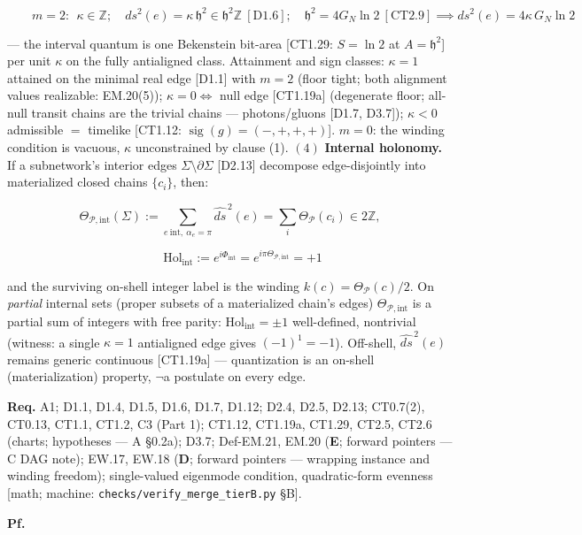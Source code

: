 \begin{theorem}
\[
\qquad m=2:\ \ \kappa\in\mathbb Z;\quad ds^2(e)=\kappa\,\mathfrak h^2\in\mathfrak h^2\mathbb Z\ [\mathrm{D1.6}];\quad \mathfrak h^2=4G_N\ln2\ [\mathrm{CT2.9}]\implies ds^2(e)=4\kappa\,G_N\ln2
\]

— the interval quantum is one Bekenstein bit-area [CT1.29: $S=\ln2$ at $A=\mathfrak h^2$] per unit $\kappa$ on the fully antialigned class. Attainment and sign classes: $\kappa=1$ attained on the minimal real edge [D1.1] with $m=2$ (floor tight; both alignment values realizable: EM.20(5)); $\kappa=0\iff$ null edge [CT1.19a] (degenerate floor; all-null transit chains are the trivial chains — photons/gluons [D1.7, D3.7]); $\kappa<0$ admissible $=$ timelike [CT1.12: $\operatorname{sig}(g)=(-,+,+,+)$]. $m=0$: the winding condition is vacuous, $\kappa$ unconstrained by clause (1). $(4)$ \textbf{Internal holonomy.} If a subnetwork's interior edges $\Sigma\setminus\partial\Sigma$ [D2.13] decompose edge-disjointly into materialized closed chains $\{c_i\}$, then:

\[
\Theta_{\mathcal P,\mathrm{int}}(\Sigma):=\!\!\sum_{e\ \mathrm{int},\ \alpha_e=\pi}\!\!\widehat{ds}^{\,2}(e)=\sum_i\Theta_{\mathcal P}(c_i)\in2\mathbb Z,
\]

\[
\qquad \mathrm{Hol}_{\mathrm{int}}:=e^{i\Phi_{\mathrm{int}}}=e^{i\pi\Theta_{\mathcal P,\mathrm{int}}}=+1
\]

and the surviving on-shell integer label is the winding $k(c)=\Theta_{\mathcal P}(c)/2$. On \textit{partial} internal sets (proper subsets of a materialized chain's edges) $\Theta_{\mathcal P,\mathrm{int}}$ is a partial sum of integers with free parity: $\mathrm{Hol}_{\mathrm{int}}=\pm1$ well-defined, nontrivial (witness: a single $\kappa=1$ antialigned edge gives $(-1)^1=-1$). Off-shell, $\widehat{ds}^{\,2}(e)$ remains generic continuous [CT1.19a] — quantization is an on-shell (materialization) property, $\neg$a postulate on every edge.

\textbf{Req.} A1; D1.1, D1.4, D1.5, D1.6, D1.7, D1.12; D2.4, D2.5, D2.13; CT0.7(2), CT0.13, CT1.1, CT1.2, C3 (Part 1); CT1.12, CT1.19a, CT1.29, CT2.5, CT2.6 (charts; hypotheses — A §0.2a); D3.7; Def-EM.21, EM.20 (\textbf{E}; forward pointers — C DAG note); EW.17, EW.18 (\textbf{D}; forward pointers — wrapping instance and winding freedom); single-valued eigenmode condition, quadratic-form evenness [math; machine: \texttt{checks/\allowbreak{}verify\_\allowbreak{}merge\_\allowbreak{}tierB.py} §B].

\textbf{Pf.}


\end{theorem}
